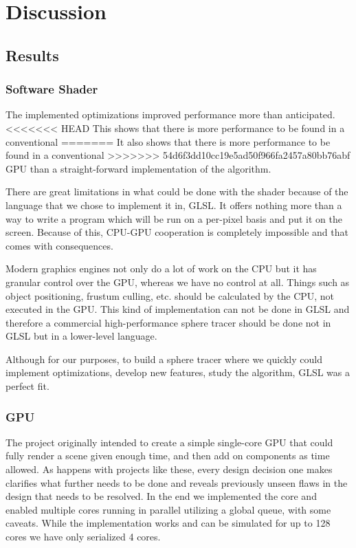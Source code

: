 \chapter{Discussion}
	
	\section{Results}
		
		\subsection{Software Shader}
		
			The implemented optimizations improved performance more than anticipated.
<<<<<<< HEAD
			This shows that there is more performance to be found in a conventional
=======
			It also shows that there is more performance to be found in a conventional
>>>>>>> 54d6f3dd10cc19e5ad50f966fa2457a80bb76abf
			GPU than a straight-forward implementation of the algorithm. 

			There are great limitations in what could be done with the shader because
			of the language that we chose to implement it in, GLSL. It offers nothing 
			more than a way to write a program which will be run on a per-pixel basis
			and put it on the screen. Because of this, CPU-GPU cooperation is completely
			impossible and that comes with consequences.

			Modern graphics engines not only do a lot of work on the
			CPU but it has granular control over the GPU, whereas we have no control
			at all. Things such as object positioning, frustum culling, etc. should be 
			calculated by the CPU, not executed in the GPU. This kind of implementation can 
			not be done in GLSL and therefore a commercial high-performance sphere tracer should be done not in 
			GLSL but in a lower-level language.

			Although for our purposes, to build a sphere tracer where we quickly could implement
			optimizations, develop new features, study the algorithm, GLSL was a
			perfect fit. 
		
		\subsection{GPU} 
		
			The project originally intended to create a simple single-core GPU
			that could fully render a scene given enough time, and then add on
			components as time allowed. As happens with projects like these,
			every design decision one makes clarifies what further needs to be
			done and reveals previously unseen flaws in the design that needs
			to be resolved. In the end we implemented the core and enabled
			multiple cores running in parallel utilizing a global queue, with
			some caveats. While the implementation works and can be simulated
			for up to 128 cores we have only serialized 4 cores. 
			
